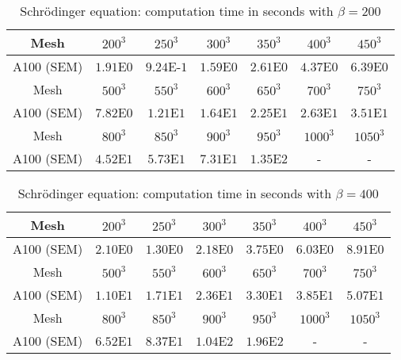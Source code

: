 \begin{table}[ht!]
    \centering
    \begin{tabular}{|c|c|c|c|c|c|c|}
    \hline
          Mesh & $200^3$ & $250^3$ & $300^3$ & $350^3$ & $400^3$ & $450^3$\\
    \hline
         A100 (SEM) & $1.91$E$0$ & $9.24$E-$1$ & $1.59$E$0$ & $2.61$E$0$ & $4.37$E$0$ & $6.39$E$0$\\
    \hline
    \hline
         Mesh & $500^3$ & $550^3$ & $600^3$ & $650^3$ & $700^3$ & $750^3$\\
    \hline
         A100 (SEM) & $7.82$E$0$ & $1.21$E$1$ & $1.64$E$1$ & $2.25$E$1$ & $2.63$E$1$ & $3.51$E$1$\\
    \hline
    \hline
         Mesh & $800^3$ & $850^3$ & $900^3$ & $950^3$ & $1000^3$ & $1050^3$\\
    \hline
         A100 (SEM) & $4.52$E$1$ & $5.73$E$1$ & $7.31$E$1$ & $1.35$E$2$ & - & -\\
    \hline
    \end{tabular}
    \caption{Schr{\"o}dinger equation: computation time in seconds with $\beta = 200$}
    \label{tab7: GPU_schrodinger_beta200}
\end{table}
\begin{table}[ht!]
    \centering
    \begin{tabular}{|c|c|c|c|c|c|c|}
    \hline
          Mesh & $200^3$ & $250^3$ & $300^3$ & $350^3$ & $400^3$ & $450^3$\\
    \hline
         A100 (SEM) & $2.10$E$0$ & $1.30$E$0$ & $2.18$E$0$ & $3.75$E$0$ & $6.03$E$0$ & $8.91$E$0$\\
    \hline
    \hline
         Mesh & $500^3$ & $550^3$ & $600^3$ & $650^3$ & $700^3$ & $750^3$\\
    \hline
         A100 (SEM) & $1.10$E$1$ & $1.71$E$1$ & $2.36$E$1$ & $3.30$E$1$ & $3.85$E$1$ & $5.07$E$1$\\
    \hline
    \hline
         Mesh & $800^3$ & $850^3$ & $900^3$ & $950^3$ & $1000^3$ & $1050^3$\\
    \hline
         A100 (SEM) & $6.52$E$1$ & $8.37$E$1$ & $1.04$E$2$ & $1.96$E$2$ & - & -\\
    \hline
    \end{tabular}
    \caption{Schr{\"o}dinger equation: computation time in seconds with $\beta = 400$}
    \label{tab8: GPU_schrodinger_beta400}
\end{table}


